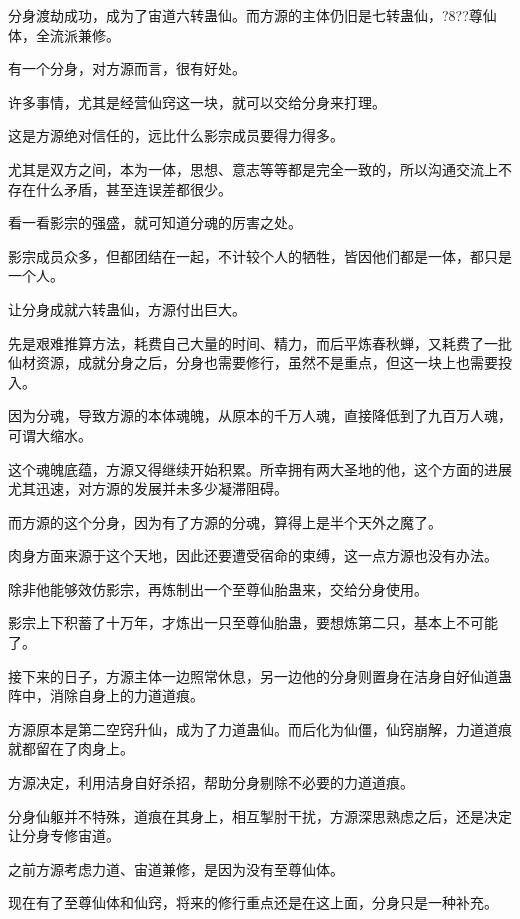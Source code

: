 
\begin{this_body}

分身渡劫成功，成为了宙道六转蛊仙。而方源的主体仍旧是七转蛊仙，?8??尊仙体，全流派兼修。

有一个分身，对方源而言，很有好处。

许多事情，尤其是经营仙窍这一块，就可以交给分身来打理。

这是方源绝对信任的，远比什么影宗成员要得力得多。

尤其是双方之间，本为一体，思想、意志等等都是完全一致的，所以沟通交流上不存在什么矛盾，甚至连误差都很少。

看一看影宗的强盛，就可知道分魂的厉害之处。

影宗成员众多，但都团结在一起，不计较个人的牺牲，皆因他们都是一体，都只是一个人。

让分身成就六转蛊仙，方源付出巨大。

先是艰难推算方法，耗费自己大量的时间、精力，而后平炼春秋蝉，又耗费了一批仙材资源，成就分身之后，分身也需要修行，虽然不是重点，但这一块上也需要投入。

因为分魂，导致方源的本体魂魄，从原本的千万人魂，直接降低到了九百万人魂，可谓大缩水。

这个魂魄底蕴，方源又得继续开始积累。所幸拥有两大圣地的他，这个方面的进展尤其迅速，对方源的发展并未多少凝滞阻碍。

而方源的这个分身，因为有了方源的分魂，算得上是半个天外之魔了。

肉身方面来源于这个天地，因此还要遭受宿命的束缚，这一点方源也没有办法。

除非他能够效仿影宗，再炼制出一个至尊仙胎蛊来，交给分身使用。

影宗上下积蓄了十万年，才炼出一只至尊仙胎蛊，要想炼第二只，基本上不可能了。

接下来的日子，方源主体一边照常休息，另一边他的分身则置身在洁身自好仙道蛊阵中，消除自身上的力道道痕。

方源原本是第二空窍升仙，成为了力道蛊仙。而后化为仙僵，仙窍崩解，力道道痕就都留在了肉身上。

方源决定，利用洁身自好杀招，帮助分身剔除不必要的力道道痕。

分身仙躯并不特殊，道痕在其身上，相互掣肘干扰，方源深思熟虑之后，还是决定让分身专修宙道。

之前方源考虑力道、宙道兼修，是因为没有至尊仙体。

现在有了至尊仙体和仙窍，将来的修行重点还是在这上面，分身只是一种补充。


\end{this_body}
